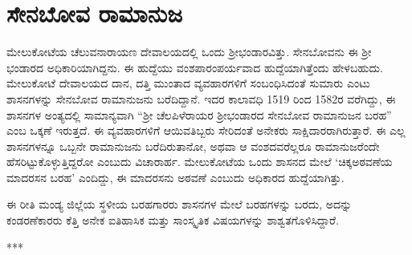 \section{ಸೇನಬೋವ ರಾಮಾನುಜ}

ಮೇಲುಕೋಟೆಯ ಚೆಲುವನಾರಾಯಣ ದೇವಾಲಯದಲ್ಲಿ ಒಂದು ಶ‍್ರೀಭಂಡಾರವಿತ್ತು. ಸೇನಬೋವನು ಈ ಶ‍್ರೀ ಭಂಡಾರದ ಅಧಿಕಾರಿಯಾಗಿದ್ದನು. ಈ ಹುದ್ದೆಯು ವಂಶಪಾರಂಪರ್ಯವಾದ ಹುದ್ದೆಯಾಗಿತ್ತೆಂದು ಹೇಳಬಹುದು. ಮೇಲುಕೋಟೆ ದೇವಾಲಯದ ದಾನ, ದತ್ತಿ ಮುಂತಾದ ವ್ಯವಹಾರಗಳಿಗೆ ಸಂಬಂಧಿಸಿದಂತೆ ಸುಮಾರು ಎಂಟು ಶಾಸನಗಳನ್ನು ಸೇನಬೋವ ರಾಮಾನುಜನು ಬರೆದಿದ್ದಾನೆ. ಇದರ ಕಾಲಾವಧಿ 1519 ರಿಂದ 1582ರ ವರೆಗಿದ್ದು, ಈ ಶಾಸನಗಳ ಅಂತ್ಯದಲ್ಲಿ ಸಾಮಾನ್ಯವಾಗಿ “ಶ‍್ರೀ ಚೆಲಪಿಳೆರಾಯರ ಶ‍್ರೀಭಂಡಾರದ ಸೇನಬೋವ ರಾಮಾನುಜನ ಬರಹ” ಎಂಬ ಒಕ್ಕಣೆ ಇರುತ್ತದೆ. ಈ ವ್ಯವಹಾರಗಳಿಗೆ ಆಯಿವತಿಬ್ಬರು ಸೇರಿದಂತೆ ಅನೇಕರು ಸಾಕ್ಷಿದಾರರಾಗಿರುತ್ತಾರೆ. ಈ ಎಲ್ಲ ಶಾಸನಗಳನ್ನೂ ಒಬ್ಬನೇ ರಾಮಾನುಜನು ಬರೆದಿರುತಾನೋ, ಅಥವಾ ಆ ವಂಶದವರೆಲ್ಲರೂ ರಾಮಾನುಜರೆಂದೇ ಹೆಸರಿಟ್ಟುಕೊಳ್ಳುತ್ತಿದ್ದರೋ ಎಂಬುದು ವಿಚಾರಾರ್ಹ. ಮೇಲುಕೋಟೆಯ ಒಂದು ಶಾಸನದ ಮೇಲೆ ‘ಚಿಕ್ಕಅಠವಣೆಯ ಮಾದರಸನ ಬರಹ’ ಎಂದಿದ್ದು, ಈ ಮಾದರಸನು ಅಠವಣೆ ಎಂಬುದು ಅಧಿಕಾರದ ಹುದ್ದೆಯಾಗಿತ್ತು. 

ಈ ರೀತಿ ಮಂಡ್ಯ ಜಿಲ್ಲೆಯ ಸ್ಥಳೀಯ ಬರಹಗಾರರು ಶಾಸನಗಳ ಮೇಲೆ ಬರಹಗಳನ್ನು ಬರದು, ಅದನ್ನು ಕಂಡರಣೆಕಾರರು ಕೆತ್ತಿ ಅನೇಕ ಐತಿಹಾಸಿಕ ಮತ್ತು ಸಾಂಸ್ಕೃತಿಕ ವಿಷಯಗಳನ್ನು ಶಾಶ್ವತಗೊಳಿಸಿದ್ದಾರೆ.

\begin{center}
***
\end{center}

\theendnotes


